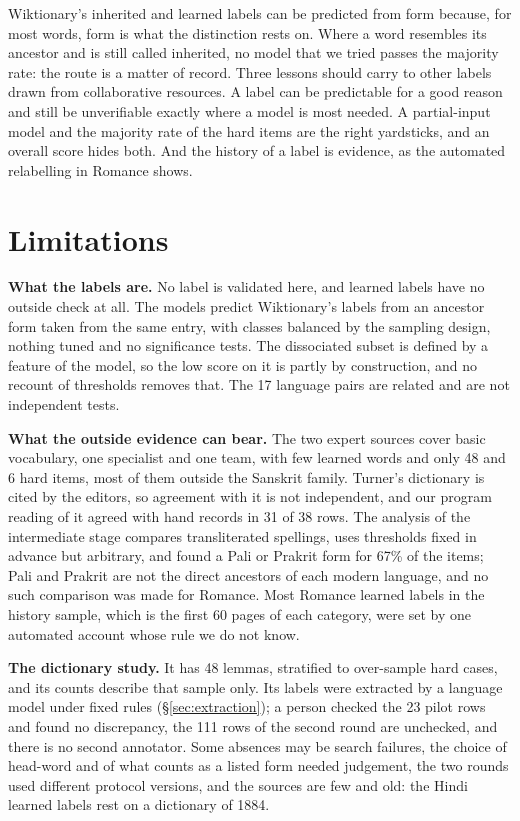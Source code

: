 \documentclass[11pt]{article}
\begin{document}
Wiktionary's inherited and learned labels can be predicted from form because, for most words, form is what the distinction rests on. Where a word resembles its ancestor and is still called inherited, no model that we tried passes the majority rate: the route is a matter of record. Three lessons should carry to other labels drawn from collaborative resources. A label can be predictable for a good reason and still be unverifiable exactly where a model is most needed. A partial-input model and the majority rate of the hard items are the right yardsticks, and an overall score hides both. And the history of a label is evidence, as the automated relabelling in Romance shows.

\section*{Limitations}

\textbf{What the labels are.} No label is validated here, and learned labels have no outside check at all. The models predict Wiktionary's labels from an ancestor form taken from the same entry, with classes balanced by the sampling design, nothing tuned and no significance tests. The dissociated subset is defined by a feature of the model, so the low score on it is partly by construction, and no recount of thresholds removes that. The 17 language pairs are related and are not independent tests.

\textbf{What the outside evidence can bear.} The two expert sources cover basic vocabulary, one specialist and one team, with few learned words and only 48 and 6 hard items, most of them outside the Sanskrit family. Turner's dictionary is cited by the editors, so agreement with it is not independent, and our program reading of it agreed with hand records in 31 of 38 rows. The analysis of the intermediate stage compares transliterated spellings, uses thresholds fixed in advance but arbitrary, and found a Pali or Prakrit form for 67\% of the items; Pali and Prakrit are not the direct ancestors of each modern language, and no such comparison was made for Romance. Most Romance learned labels in the history sample, which is the first 60 pages of each category, were set by one automated account whose rule we do not know.

\textbf{The dictionary study.} It has 48 lemmas, stratified to over-sample hard cases, and its counts describe that sample only. Its labels were extracted by a language model under fixed rules (\S\ref{sec:extraction}); a person checked the 23 pilot rows and found no discrepancy, the 111 rows of the second round are unchecked, and there is no second annotator. Some absences may be search failures, the choice of head-word and of what counts as a listed form needed judgement, the two rounds used different protocol versions, and the sources are few and old: the Hindi learned labels rest on a dictionary of 1884.
\end{document}
